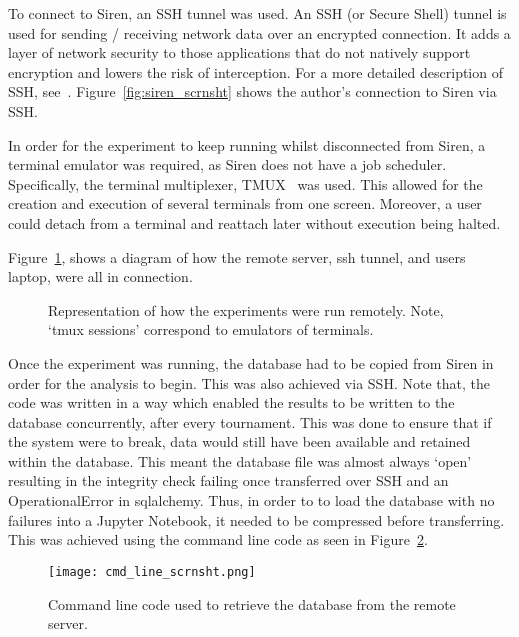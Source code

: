 To connect to Siren, an SSH tunnel was used. An SSH (or Secure Shell) tunnel is
used for sending / receiving network data over an encrypted connection. It adds
a layer of network security to those applications that do not natively support
encryption and lowers the risk of interception. For a more detailed description
of SSH, see~\cite{SSH.COM2016}. Figure~\ref{fig:siren_scrnsht} shows the author's connection to
Siren via SSH. 


In order for the experiment to keep running whilst disconnected
from Siren, a terminal emulator was required, as Siren does not have a job
scheduler. Specifically, the terminal multiplexer, TMUX~\cite{Marriott} was used. This allowed
for the creation and execution of several terminals from one screen. Moreover, a
user could detach from a terminal and reattach later without execution being
halted. 

Figure~\ref{fig:remote_comp}, shows a diagram of how the remote server, ssh tunnel, and users
laptop, were all in connection.

\begin{figure}
    \centering
    
    \caption{Representation of how the experiments were run remotely. Note, `tmux sessions' correspond to emulators of terminals.}\label{fig:remote_comp}
\end{figure}

Once the experiment was running, the database had to be copied from
Siren in order for the analysis to begin. This was also achieved via SSH. Note that, the code was written in a way
which enabled the results to be written to the database concurrently, after
every tournament. This was done to ensure that if the system were to break, data
would still have been available and retained within the database. This meant
the database file was almost always `open' resulting in the integrity check
failing once transferred over SSH and an OperationalError in sqlalchemy. Thus, in
order to to load the database with no failures into a Jupyter Notebook, it
needed to be compressed before transferring. This was achieved using the command
line code as seen in Figure~\ref{fig:cmd_code_db}.

\begin{figure}
    \centering
    \texttt{[image: cmd\_line\_scrnsht.png]}
    \caption{Command line code used to retrieve the database from the remote server.}\label{fig:cmd_code_db}
\end{figure}

